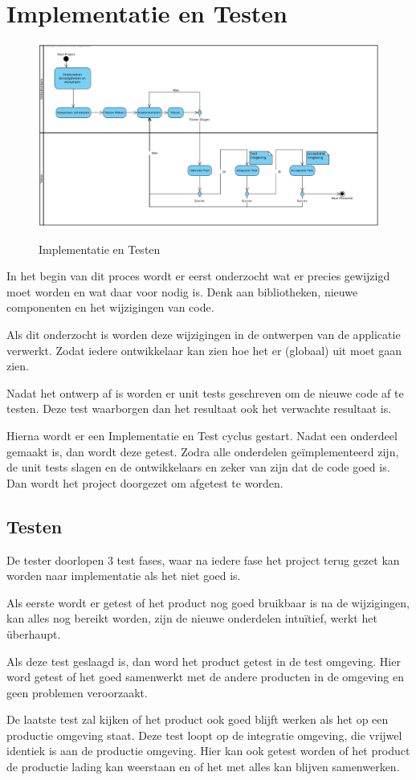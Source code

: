 \documentclass{scrreprt}
\begin{document}
	\chapter{Implementatie en Testen}
		\begin{figure}[ht]
			\centering
			\includegraphics[width=\linewidth]{implementation-testing}
			\label{fig:implementation-testing}
			\caption{Implementatie en Testen}
		\end{figure}
		In het begin van dit proces wordt er eerst onderzocht wat er precies gewijzigd moet worden en wat daar voor nodig is. Denk aan bibliotheken, nieuwe componenten en het wijzigingen van code.\par
		Als dit onderzocht is worden deze wijzigingen in de ontwerpen van de applicatie verwerkt. Zodat iedere ontwikkelaar kan zien hoe het er (globaal) uit moet gaan zien.\par
		Nadat het ontwerp af is worden er unit tests geschreven om de nieuwe code af te testen. Deze test waarborgen dan het resultaat ook het verwachte resultaat is.\par
		Hierna wordt er een Implementatie en Test cyclus gestart. Nadat een onderdeel gemaakt is, dan wordt deze getest. Zodra alle onderdelen geïmplementeerd zijn, de unit tests slagen en de ontwikkelaars en zeker van zijn dat de code goed is. Dan wordt het project doorgezet om afgetest te worden.\par
		\section{Testen}
		De tester doorlopen 3 test fases, waar na iedere fase het project terug gezet kan worden naar implementatie als het niet goed is.\par
		Als eerste wordt er getest of het product nog goed bruikbaar is na de wijzigingen, kan alles nog bereikt worden, zijn de nieuwe onderdelen intuïtief, werkt het überhaupt.\par
		Als deze test geslaagd is, dan word het product getest in de test omgeving. Hier word getest of het goed samenwerkt met de andere producten in de omgeving en geen problemen veroorzaakt.\par
		De laatste test zal kijken of het product ook goed blijft werken als het op een productie omgeving staat. Deze test loopt op de integratie omgeving, die vrijwel identiek is aan de productie omgeving. Hier kan ook getest worden of het product de productie lading kan weerstaan en of het met alles kan blijven samenwerken.
\end{document}
